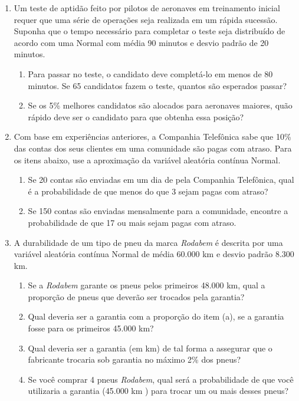 \documentclass[12pt, a4paper]{article}
\begin{document}
\begin{enumerate}
\item Um teste de aptidão feito por pilotos de aeronaves em treinamento inicial requer que uma série de operações seja realizada em um rápida sucessão. Suponha que o tempo necessário para completar o teste seja distribuído de acordo com uma Normal com média 90 minutos e desvio padrão de 20 minutos.
\begin{enumerate}
	\item Para passar no teste, o candidato deve completá-lo em menos de 80 minutos. Se 65 candidatos fazem o teste, quantos são esperados passar?
	\item Se os 5\% melhores candidatos são alocados para aeronaves maiores, quão rápido deve ser o candidato para que obtenha essa posição?
\end{enumerate}

\item Com base em experiências anteriores, a Companhia Telefônica sabe que 10\% das contas dos seus clientes em uma comunidade são pagas com atraso. Para os itens abaixo, use a aproximação da variável aleatória contínua Normal.
\begin{enumerate}
	\item Se 20 contas são enviadas em um dia de pela Companhia Telefônica, qual é a probabilidade de que menos do que 3 sejam pagas com atraso?
	\item Se 150 contas são enviadas mensalmente para a comunidade, encontre a probabilidade de que 17 ou mais sejam pagas com atraso.
\end{enumerate}

\item A durabilidade de um tipo de pneu da marca \textit{Rodabem} é descrita por uma variável aleatória contínua Normal de média 60.000 km e desvio padrão 8.300 km. 
\begin{enumerate}
	\item Se a \textit{Rodabem} garante os pneus pelos primeiros 48.000 km, qual a proporção de pneus que deverão ser trocados pela garantia?
	\item Qual deveria ser a garantia com a proporção do item (a), se a garantia fosse para os primeiros 45.000 km?
	\item Qual deveria ser a garantia (em km) de tal forma a assegurar que o fabricante trocaria sob garantia no máximo 2\% dos pneus?
	\item Se você comprar 4 pneus \textit{Rodabem}, qual será a probabilidade de que você utilizaria a garantia (45.000 km ) para trocar um ou mais desses pneus?
\end{enumerate}

\end{enumerate}
\end{document}
